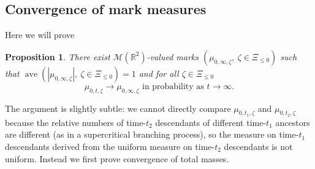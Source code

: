 \documentclass[12pt]{article}
\newtheorem{Proposition}[Lemma]{Proposition}
\newcommand{\MM}{\mbox{${\mathcal M}$}}
\newcommand{\Reals}{{\mathbb{R}}}
\DeclareMathOperator{\ave}{ave}
\begin{document}
 
\subsection{Convergence of mark measures}
\label{sec:MPPs}
Here we will prove
\begin{Proposition}
\label{P:coupledist}
There exist $\MM(\Reals^2)$-valued  marks 
$(\mu_{0, \infty, \zeta}, \ \zeta \in \Xi_{\le 0})$ such that 
$\ave ( | \mu_{0, \infty, \zeta}|, \ \zeta \in \Xi_{\le 0}) = 1$ and
for all $\zeta \in \Xi_{\le 0}$
\[  \mu_{0,t,\zeta} \to \mu_{0, \infty, \zeta} \mbox{ in probability as } t \to \infty.
\]
\end{Proposition}
The argument is slightly subtle: we cannot directly compare $\mu_{0,t_1,\zeta}$ and $\mu_{0,t_2,\zeta}$  because the relative numbers of time-$t_2$ descendants of different time-$t_1$ 
ancestors are different (as in a supercritical branching process), so the measure on time-$t_1$ descendants derived from the uniform measure on time-$t_2$ descendants is not uniform.
Instead we first prove convergence of total masses.

 
\end{document}
